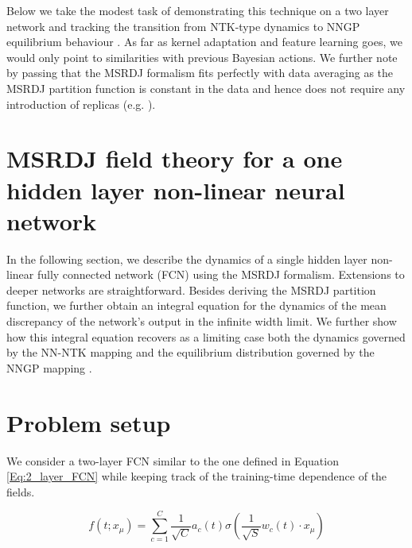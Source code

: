 Below we take the modest task of demonstrating this technique on a two layer network and tracking the transition from NTK-type dynamics to NNGP equilibrium behaviour \citep{avidan2023connectingntknngpunified}. As far as kernel adaptation and feature learning goes, we would only point to similarities with previous Bayesian actions. We further note by passing that the MSRDJ formalism fits perfectly with data averaging as the MSRDJ partition function is constant in the data and hence does not require any introduction of replicas (e.g. \cite{lindner2023theory}).

\section[MSRDJ for one hidden layer]{MSRDJ field theory for a one hidden layer non-linear neural network}
\label{chap:MSR main}
In the following section, we describe the dynamics of a single hidden layer non-linear fully connected network (FCN) using the MSRDJ formalism. Extensions to deeper networks are straightforward. Besides deriving the MSRDJ partition function, we further obtain an integral equation for the dynamics of the mean discrepancy of the network's output in the infinite width limit. We further show how this integral equation recovers as a limiting case both the dynamics governed by the NN-NTK mapping \citep{lee2019wide} and the equilibrium distribution governed by the NNGP mapping \citep{lee2017deep}.

\section{Problem setup}
We consider a two-layer FCN similar to the one defined in Equation \ref{Eq:2_layer_FCN} while keeping track of the training-time dependence of the fields.

\begin{equation}
f(t;x_\mu) =  \sum_{c=1}^{C}\frac{1}{\sqrt{C}} a_{c}(t) \sigma\left(\frac{1}{\sqrt{S}}{w}_c(t) \cdot {x}_{\mu}\right) 
\end{equation}

